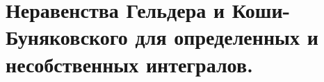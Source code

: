 \documentclass[../main.tex]{subfiles}
\begin{document}
\newpage
\section{Неравенства Гельдера и Коши-Буняковского для определенных и несобственных интегралов.}
\end{document}
